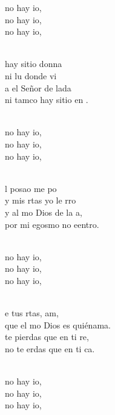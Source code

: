\documentclass[12pt]{article}
\begin{document}
\begin{multicols*}{2}
\begin{cancion}%
	\begin{chorus}%
	 no hay io, \\
	no hay io, \\
	no hay io, \\
	\end{chorus}%
	\jump\\
	hay sitio donna\\
	ni lu donde vi\\
	a el Señor de lada\\
	ni tamco hay sitio en .\\\jump\\
	\begin{chorus}%
	 no hay io, \\
	no hay io, \\
	no hay io, \\
	\end{chorus}%
	\jump\\
	l posao me po\\
	y mis rtas yo le rro\\
	y al mo Dios de la a,\\
	por mi egosmo no eentro.\\\jump\\
	\begin{chorus}%
	 no hay io, \\
	no hay io, \\
	no hay io, \\
	\end{chorus}%
	\jump\\
	e tus rtas, am,\\
	que el mo Dios es quiénama.\\
	te pierdas que en ti re,\\
	no te erdas que en ti ca.\\\jump\\
	\begin{chorus}%
	 no hay io, \\
	no hay io, \\
	no hay io, \\
	\end{chorus}%
	\jump\\
\end{cancion}%


\end{multicols*}
\end{document}
